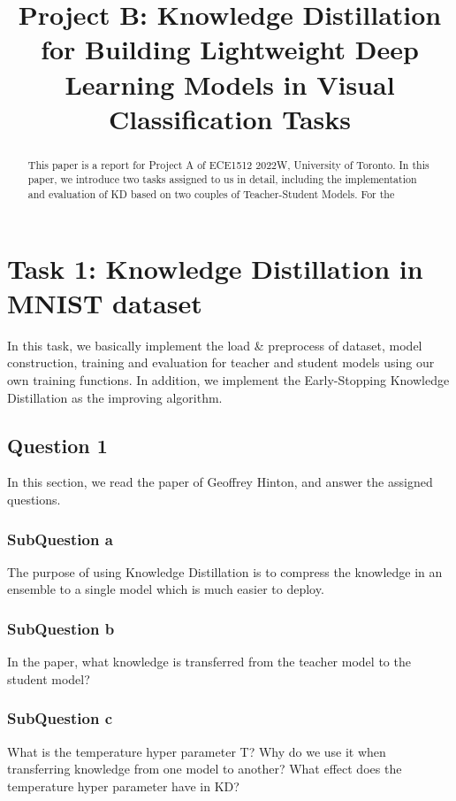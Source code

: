 \documentclass[conference]{IEEEtran}
\begin{document}
\title{Project B: Knowledge Distillation for Building Lightweight Deep Learning Models in Visual Classification Tasks
}
\maketitle

\begin{abstract}
This paper is a report for Project A of ECE1512 2022W, University of Toronto.
In this paper, we introduce two tasks assigned to us in detail, including the implementation and evaluation of KD based on two couples of Teacher-Student Models.
For the 
\end{abstract}

\section{Task 1: Knowledge Distillation in MNIST dataset}
In this task, we basically implement the load \& preprocess of dataset, model construction, training and evaluation for teacher and student models using our own training functions.
In addition, we implement the Early-Stopping Knowledge Distillation as the improving algorithm.
\subsection{Question 1}

In this section, we read the paper of Geoffrey Hinton\cite{b6}, and answer the assigned questions.

\subsubsection{SubQuestion a}
The purpose of using Knowledge Distillation is to compress the knowledge in an ensemble to a single model which is much easier to deploy.

\subsubsection{SubQuestion b}
In the paper, what knowledge is transferred from the teacher model to the student model?
\subsubsection{SubQuestion c}
What is the temperature hyper parameter T? Why do we use it when transferring knowledge
from one model to another? What effect does the temperature hyper parameter have in KD?
\end{document}
